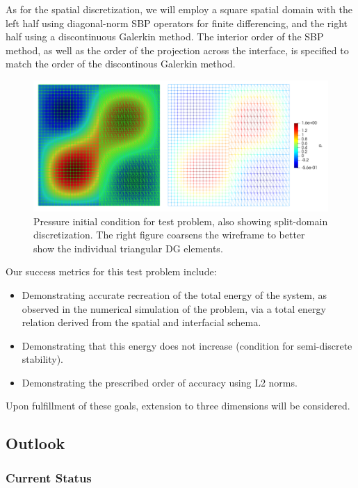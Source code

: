 As for the spatial discretization, we will employ a square spatial domain
with the left half using diagonal-norm SBP operators for finite differencing,
and the right half using a discontinuous Galerkin method. The interior order
of the SBP method, as well as the order of the projection across the interface,
is specified to match the order of the discontinous Galerkin method.
\begin{figure}
\centering
\includegraphics[width=0.9\linewidth,trim=4 4 4 4,clip]{figures/split_domain_wave_double.png}
\caption{Pressure initial condition for test problem, also showing split-domain
	 discretization. The right figure coarsens the wireframe to better show the
	 individual triangular DG elements.}
\label{fig:split_domain}
\end{figure}
Our success metrics for this test problem include:
\begin{itemize}
\item{Demonstrating accurate recreation of the total energy of the system, as observed in the
      numerical simulation of the problem, via a total energy relation derived from the
      spatial and interfacial schema.}
\item{Demonstrating that this energy does not increase (condition for semi-discrete stability).}
\item{Demonstrating the prescribed order of accuracy using L2 norms.}
\end{itemize}
Upon fulfillment of these goals, extension to three dimensions will be considered.

\subsection{Outlook}

\subsubsection{Current Status}

